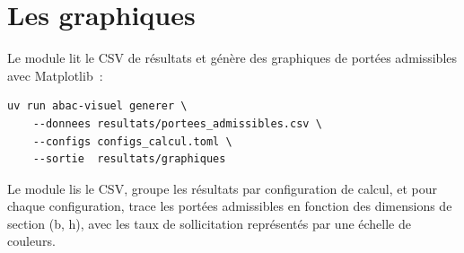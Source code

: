 \section{Les graphiques}

Le module  lit le CSV de r\'esultats et g\'en\`ere
des graphiques de port\'ees admissibles avec Matplotlib~:

\begin{lstlisting}[style=toml, language={}, caption={Lancement de la génération graphique}]
uv run abac-visuel generer \
    --donnees resultats/portees_admissibles.csv \
    --configs configs_calcul.toml \
    --sortie  resultats/graphiques
\end{lstlisting}

Le module  lis le CSV,
groupe les r\'esultats par configuration de calcul,
et pour chaque configuration, trace les port\'ees admissibles
en fonction des dimensions de section (b, h), avec les taux de
sollicitation repr\'esent\'es par une \'echelle de couleurs.
